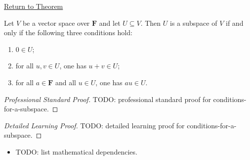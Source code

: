 \newpage
{}
\label{prf:conditions-for-a-subspace}

\begin{remark*}[Return]
\hyperref[thm:conditions-for-a-subspace]{Return to Theorem}
\end{remark*}

\begin{theorem*}
Let $V$ be a vector space over $\mathbf{F}$ and let $U \subseteq V$.
Then $U$ is a subspace of $V$ if and only if the following three conditions hold:
\begin{enumerate}[label=(\roman*)]
  \item $0 \in U$;
  \item for all $u,v \in U$, one has $u+v \in U$;
  \item for all $a \in \mathbf{F}$ and all $u \in U$, one has $au \in U$.
\end{enumerate}
\end{theorem*}

\begin{proof}[Professional Standard Proof]
\LRAProofBodyStart
TODO: professional standard proof for conditions-for-a-subspace.
\end{proof}

\begin{proof}[Detailed Learning Proof]
\LRAProofBodyStart
TODO: detailed learning proof for conditions-for-a-subspace.
\end{proof}

\begin{remark*}
\end{remark*}

\begin{dependencies}
\begin{itemize}
  \item TODO: list mathematical dependencies.
\end{itemize}
\end{dependencies}

\clearpage
